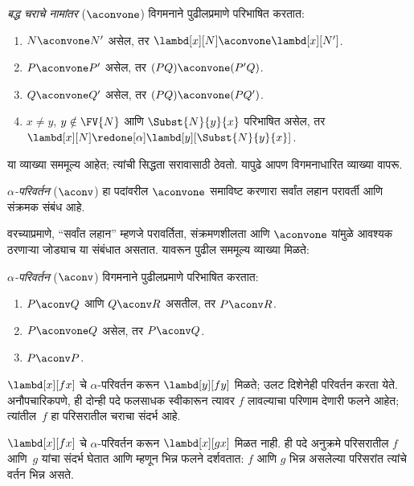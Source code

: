 \documentclass[../../../include/open-logic-section]{subfiles}
\begin{document}
\begin{defn}[बद्ध चराचे नामांतर, $\aconvone$] 
  \emph{बद्ध चराचे नामांतर} ($\aconvone$) विगमनाने
  पुढीलप्रमाणे परिभाषित करतात:
  \begin{enumerate}
  \item $N \aconvone N'$ असेल, तर $\lambd[x][N] \aconvone
    \lambd[x][N']$. 
  \item $P \aconvone P'$ असेल, तर $(PQ) \aconvone (P'Q)$. 
  \item $Q \aconvone Q'$ असेल, तर $(PQ) \aconvone (PQ')$. 
  \item $x \neq y$, $y \notin \FV{N}$ आणि $\Subst{N}{y}{x}$
    परिभाषित असेल, तर
    $\lambd[x][N] \redone[\alpha] \lambd[y][\Subst{N}{y}{x}]$.
  \end{enumerate}
\end{defn}

या व्याख्या सममूल्य आहेत; त्यांची सिद्धता सरावासाठी ठेवतो.
यापुढे आपण विगमनाधारित व्याख्या वापरू.

\begin{defn}
  \emph{$\alpha$-परिवर्तन} ($\aconv$) हा पदांवरील
  $\aconvone$ समाविष्ट करणारा सर्वांत लहान परावर्ती
  आणि संक्रमक संबंध आहे.
\end{defn}

वरच्याप्रमाणे, ``सर्वांत लहान'' म्हणजे परावर्तिता, संक्रमणशीलता आणि
$\aconvone$ यांमुळे आवश्यक ठरणाऱ्या जोड्याच या संबंधात
असतात. यावरून पुढील सममूल्य व्याख्या मिळते:

\begin{defn} 
  \emph{$\alpha$-परिवर्तन} ($\aconv$) विगमनाने
  पुढीलप्रमाणे परिभाषित करतात:
  \begin{enumerate}
  \item $P \aconv Q$ आणि $Q \aconv R$ असतील, तर $P \aconv R$.
  \item $P \aconvone Q$ असेल, तर $P \aconv Q$. 
  \item $P \aconv P$. 
  \end{enumerate}
\end{defn}

\begin{ex}
  $\lambd[x][f x]$ चे $\alpha$-परिवर्तन करून
  $\lambd[y][f
  y]$ मिळते; उलट दिशेनेही परिवर्तन करता येते.
  अनौपचारिकपणे, ही दोन्ही पदे फलसाधक स्वीकारून
  त्यावर $f$ लावल्याचा परिणाम देणारी फलने आहेत;
  त्यांतील~$f$ हा परिसरातील चराचा संदर्भ आहे.

  $\lambd[x][f x]$ चे $\alpha$-परिवर्तन करून
  $\lambd[x][g
    x]$ मिळत नाही. ही पदे अनुक्रमे परिसरातील
  $f$ आणि~$g$ यांचा संदर्भ घेतात आणि म्हणून भिन्न
  फलने दर्शवतात: $f$ आणि $g$ भिन्न असलेल्या परिसरांत
  त्यांचे वर्तन भिन्न असते.
\end{ex}
\end{document}

